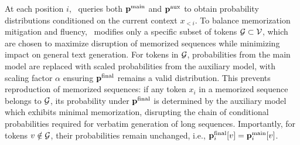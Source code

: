 At each position \(i\), \sys\ queries both \(\mathbf{p}^{\text{main}}\) and \(\mathbf{p}^{\text{aux}}\) to obtain probability distributions conditioned on the current context \(x_{<i}\). To balance memorization mitigation and fluency, \sys\ modifies only a specific subset of tokens \(\mathcal{G} \subset \mathcal{V}\), which are chosen to maximize disruption of memorized sequences while minimizing impact on general text generation. For tokens in \(\mathcal{G}\), probabilities from the main model are replaced with scaled probabilities from the auxiliary model, with scaling factor \(\alpha\) ensuring \(\mathbf{p}^{\text{final}}\) remains a valid distribution. This prevents reproduction of memorized sequences: if any token \(x_i\) in a memorized sequence belongs to \(\mathcal{G}\), its probability under \(\mathbf{p}^{\text{final}}\) is determined by the auxiliary model which exhibits minimal memorization, disrupting the chain of conditional probabilities required for verbatim generation of long sequences. Importantly, for tokens \(v \notin \mathcal{G}\), their probabilities remain unchanged, i.e., \(\mathbf{p}^{\text{final}}_i[v] = \mathbf{p}^{\text{main}}_i[v]\).
